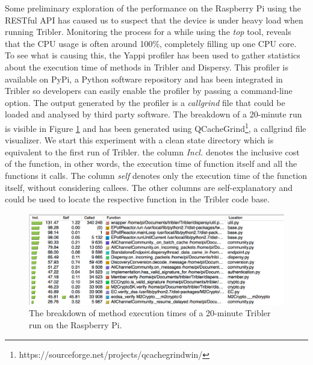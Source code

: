 Some preliminary exploration of the performance on the Raspberry Pi using the RESTful API has caused us to suspect that the device is under heavy load when running Tribler. Monitoring the process for a while using the \emph{top} tool, reveals that the CPU usage is often around 100\%, completely filling up one CPU core. To see what is causing this, the Yappi profiler has been used to gather statistics about the execution time of methods in Tribler and Dispersy. This profiler is available on PyPi, a Python software repository and has been integrated in Tribler so developers can easily enable the profiler by passing a command-line option. The output generated by the profiler is a \emph{callgrind} file that could be loaded and analysed by third party software. The breakdown of a 20-minute run is visible in Figure \ref{fig:yappi_breakdown} and has been generated using QCacheGrind\footnote{https://sourceforge.net/projects/qcachegrindwin/}, a callgrind file visualizer. We start this experiment with a clean state directory which is equivalent to the first run of Tribler. the column \emph{Incl.} denotes the inclusive cost of the function, in other words, the execution time of function itself and all the functions it calls. The column \emph{self} denotes only the execution time of the function itself, without considering callees. The other columns are self-explanatory and could be used to locate the respective function in the Tribler code base.\\

\begin{figure}[!h]
	\centering
	\includegraphics[width=1.0\columnwidth]{images/experiments/yappi_breakdown}
	\caption{The breakdown of method execution times of a 20-minute Tribler run on the Raspberry Pi.}
	\label{fig:yappi_breakdown}
\end{figure}

